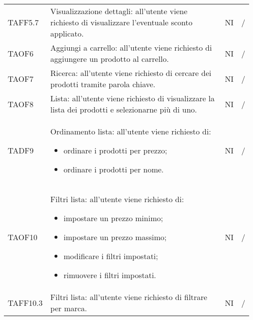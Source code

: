 \begin{center}
\begin{longtable}[!h]{p{60px} p{240px} p{35px} p{35px}}
        TAFF5.7                          & Visualizzazione dettagli: all'utente viene richiesto di visualizzare l'eventuale sconto applicato.                                                                  & NI             & /             \\
        TAOF6                            & Aggiungi a carrello: all'utente viene richiesto di aggiungere un prodotto al carrello.                                                                              & NI             & /             \\
        TAOF7                            & Ricerca: all'utente viene richiesto di cercare dei prodotti tramite parola chiave.                                                                                  & NI             & /             \\
        TAOF8                            & Lista: all'utente viene richiesto di visualizzare la lista dei prodotti e selezionarne pi\`u di uno.                                                                & NI             & /             \\
        TADF9                            & Ordinamento lista: all'utente viene richiesto di: \begin{itemize} \item ordinare i prodotti per prezzo; \item ordinare i prodotti per nome. \end{itemize}                                                                                        & NI             & /             \\
        TAOF10                           & Filtri lista: all'utente viene richiesto di: \begin{itemize} \item impostare un prezzo minimo; \item impostare un prezzo massimo; \item modificare i filtri impostati; \item rimuovere i filtri impostati. \end{itemize}                                                                                             & NI             & /             \\
        TAFF10.3                         & Filtri lista: all'utente viene richiesto di filtrare per marca.                                                                                                     & NI             & /             \\

\end{longtable}
\end{center}
